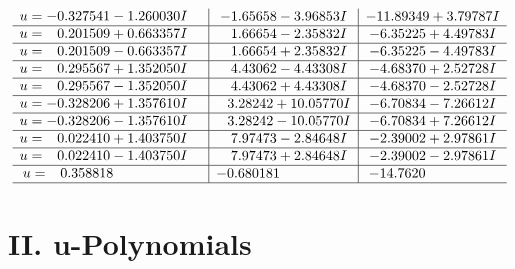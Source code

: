 \documentclass[1p]{elsarticle_modified}
\theoremstyle{definition}
\begin{document}
$$\begin{array}{c|c|c}
\begin{aligned}
u &= -0.327541 - 1.260030 I\end{aligned}
 & -1.65658 - 3.96853 I & -11.89349 + 3.79787 I \\ \hline\begin{aligned}
u &= \phantom{-}0.201509 + 0.663357 I\end{aligned}
 & \phantom{-}1.66654 - 2.35832 I & -6.35225 + 4.49783 I \\ \hline\begin{aligned}
u &= \phantom{-}0.201509 - 0.663357 I\end{aligned}
 & \phantom{-}1.66654 + 2.35832 I & -6.35225 - 4.49783 I \\ \hline\begin{aligned}
u &= \phantom{-}0.295567 + 1.352050 I\end{aligned}
 & \phantom{-}4.43062 - 4.43308 I & -4.68370 + 2.52728 I \\ \hline\begin{aligned}
u &= \phantom{-}0.295567 - 1.352050 I\end{aligned}
 & \phantom{-}4.43062 + 4.43308 I & -4.68370 - 2.52728 I \\ \hline\begin{aligned}
u &= -0.328206 + 1.357610 I\end{aligned}
 & \phantom{-}3.28242 + 10.05770 I & -6.70834 - 7.26612 I \\ \hline\begin{aligned}
u &= -0.328206 - 1.357610 I\end{aligned}
 & \phantom{-}3.28242 - 10.05770 I & -6.70834 + 7.26612 I \\ \hline\begin{aligned}
u &= \phantom{-}0.022410 + 1.403750 I\end{aligned}
 & \phantom{-}7.97473 - 2.84648 I & -2.39002 + 2.97861 I \\ \hline\begin{aligned}
u &= \phantom{-}0.022410 - 1.403750 I\end{aligned}
 & \phantom{-}7.97473 + 2.84648 I & -2.39002 - 2.97861 I \\ \hline\begin{aligned}
u &= \phantom{-}0.358818\phantom{ +0.000000I}\end{aligned}
 & -0.680181\phantom{ +0.000000I} & -14.7620\phantom{ +0.000000I}\\
 \hline 
 \end{array}$$\newpage
\newpage\renewcommand{\arraystretch}{1}
\centering \section*{ II. u-Polynomials}
\end{document}
